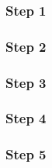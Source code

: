 \subsubsection{Step 1}
\blindtext

\subsubsection{Step 2}
\blindtext

\subsubsection{Step 3}
\blindtext

\subsubsection{Step 4}
\blindtext

\subsubsection{Step 5}
\blindtext
